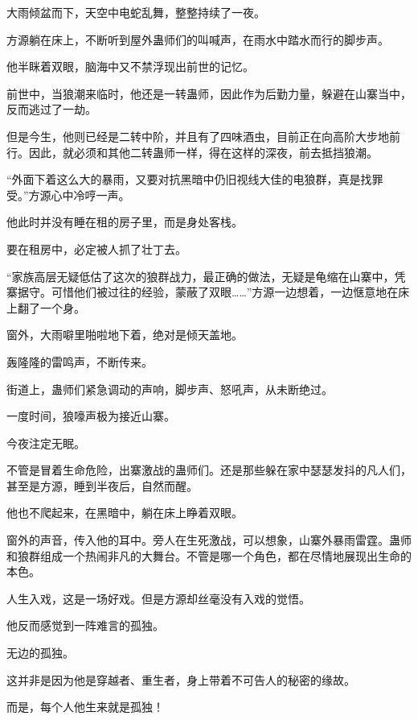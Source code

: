 
\begin{this_body}



大雨倾盆而下，天空中电蛇乱舞，整整持续了一夜。

方源躺在床上，不断听到屋外蛊师们的叫喊声，在雨水中踏水而行的脚步声。

他半眯着双眼，脑海中又不禁浮现出前世的记忆。

前世中，当狼潮来临时，他还是一转蛊师，因此作为后勤力量，躲避在山寨当中，反而逃过了一劫。

但是今生，他则已经是二转中阶，并且有了四味酒虫，目前正在向高阶大步地前行。因此，就必须和其他二转蛊师一样，得在这样的深夜，前去抵挡狼潮。

“外面下着这么大的暴雨，又要对抗黑暗中仍旧视线大佳的电狼群，真是找罪受。”方源心中冷哼一声。

他此时并没有睡在租的房子里，而是身处客栈。

要在租房中，必定被人抓了壮丁去。

“家族高层无疑低估了这次的狼群战力，最正确的做法，无疑是龟缩在山寨中，凭寨据守。可惜他们被过往的经验，蒙蔽了双眼……”方源一边想着，一边惬意地在床上翻了一个身。

窗外，大雨噼里啪啦地下着，绝对是倾天盖地。

轰隆隆的雷鸣声，不断传来。

街道上，蛊师们紧急调动的声响，脚步声、怒吼声，从未断绝过。

一度时间，狼嚎声极为接近山寨。

今夜注定无眠。

不管是冒着生命危险，出寨激战的蛊师们。还是那些躲在家中瑟瑟发抖的凡人们，甚至是方源，睡到半夜后，自然而醒。

他也不爬起来，在黑暗中，躺在床上睁着双眼。

窗外的声音，传入他的耳中。旁人在生死激战，可以想象，山寨外暴雨雷霆。蛊师和狼群组成一个热闹非凡的大舞台。不管是哪一个角色，都在尽情地展现出生命的本色。

人生入戏，这是一场好戏。但是方源却丝毫没有入戏的觉悟。

他反而感觉到一阵难言的孤独。

无边的孤独。

这并非是因为他是穿越者、重生者，身上带着不可告人的秘密的缘故。

而是，每个人他生来就是孤独！


\end{this_body}
